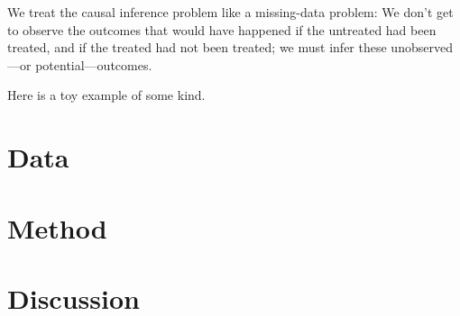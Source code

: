 \documentclass[12pt, letterpaper, preprint]{aastex}
\begin{document}
We treat the causal inference problem like a missing-data problem:
We don't get to observe the outcomes that would have happened if the untreated had been treated,
and if the treated had not been treated;
we must infer these unobserved---or potential---outcomes.

Here is a toy example of some kind.

\section{Data}

\section{Method}

\section{Discussion}
\end{document}
